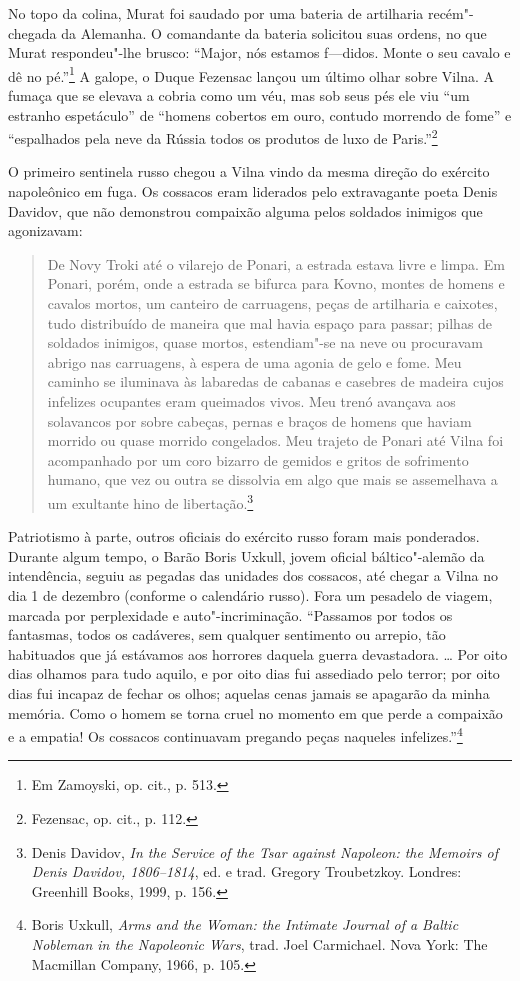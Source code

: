No topo da colina, Murat foi saudado por uma bateria de artilharia
recém"-chegada da Alemanha. O comandante da bateria solicitou suas
ordens, no que Murat respondeu"-lhe brusco: ``Major, nós estamos
f---didos. Monte o seu cavalo e dê no pé.''\footnote{Em Zamoyski, op. cit., p. 513.} A galope, o Duque Fezensac lançou um último olhar sobre Vilna. A fumaça que se elevava a cobria como um véu, mas sob seus
pés ele viu ``um estranho espetáculo'' de ``homens cobertos em ouro,
contudo morrendo de fome'' e ``espalhados pela neve da Rússia todos os
produtos de luxo de Paris.''\footnote{Fezensac, op. cit., p. 112.}

\asterisc

O primeiro sentinela russo chegou a Vilna vindo da mesma direção do
exército napoleônico em fuga. Os cossacos eram liderados pelo
extravagante poeta Denis Davidov, que não demonstrou compaixão alguma
pelos soldados inimigos que agonizavam:

\begin{quote}
De Novy Troki até o vilarejo de Ponari, a estrada estava livre e limpa.
Em Ponari, porém, onde a estrada se bifurca para Kovno, montes de homens
e cavalos mortos, um canteiro de carruagens, peças de artilharia e
caixotes, tudo distribuído de maneira que mal havia espaço para passar;
pilhas de soldados inimigos, quase mortos, estendiam"-se na neve ou
procuravam abrigo nas carruagens, à espera de uma agonia de gelo e fome.
Meu caminho se iluminava às labaredas de cabanas e casebres de madeira
cujos infelizes ocupantes eram queimados vivos. Meu trenó avançava aos
solavancos por sobre cabeças, pernas e braços de homens que haviam
morrido ou quase morrido congelados. Meu trajeto de Ponari até Vilna foi
acompanhado por um coro bizarro de gemidos e gritos de sofrimento
humano, que vez ou outra se dissolvia em algo que mais se assemelhava a
um exultante hino de libertação.\footnote{Denis Davidov, \textit{In the Service of the Tsar against Napoleon: the Memoirs of Denis Davidov, 1806--1814}, ed. e trad. Gregory Troubetzkoy. Londres: Greenhill Books, 1999, p. 156.} 
\end{quote}

Patriotismo à parte, outros oficiais do exército russo foram mais
ponderados. Durante algum tempo, o Barão Boris Uxkull, jovem oficial
báltico"-alemão da intendência, seguiu as pegadas das unidades dos
cossacos, até chegar a Vilna no dia 1 de dezembro (conforme o calendário
russo). Fora um pesadelo de viagem, marcada por perplexidade e
auto"-incriminação. ``Passamos por todos os fantasmas, todos os
cadáveres, sem qualquer sentimento ou arrepio, tão habituados que já
estávamos aos horrores daquela guerra devastadora. \ldots{} Por oito
dias olhamos para tudo aquilo, e por oito dias fui assediado pelo
terror; por oito dias fui incapaz de fechar os olhos; aquelas cenas
jamais se apagarão da minha memória. Como o homem se torna cruel no
momento em que perde a compaixão e a empatia! Os cossacos continuavam
pregando peças naqueles infelizes.''\footnote{Boris Uxkull, \textit{Arms and the Woman: the Intimate Journal of a Baltic Nobleman in the Napoleonic Wars}, trad. Joel Carmichael. Nova York: The Macmillan Company, 1966, p. 105.}

